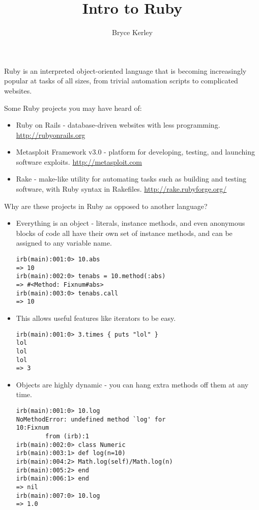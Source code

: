 \documentclass{slides}
\title{Intro to Ruby}
\author{Bryce Kerley}
\newcommand{\svn}[1]{\svnsub#1}
\def\svnsub$#1${#1}
\begin{document}
 \selectfont
\maketitle
\begin{slide}
Ruby is an interpreted object-oriented language that is becoming increasingly popular at tasks of all sizes, from trivial automation scripts to complicated websites.

Some Ruby projects you may have heard of:
\begin{itemize}
\item Ruby on Rails - database-driven websites with less programming. \url{http://rubyonrails.org}
\item Metasploit Framework v3.0 - platform for developing, testing, and launching software exploits.  \url{http://metasploit.com}
\item Rake - make-like utility for automating tasks such as building and testing software, with Ruby syntax in Rakefiles.  \url{http://rake.rubyforge.org/}
\end{itemize}
\end{slide}

\begin{slide}
Why are these projects in Ruby as opposed to another language?
\begin{itemize}
\item Everything is an object - literals, instance methods, and even anonymous blocks of code all have their own set of instance methods, and can be assigned to any variable name.
\begin{verbatim}
irb(main):001:0> 10.abs
=> 10
irb(main):002:0> tenabs = 10.method(:abs)
=> #<Method: Fixnum#abs>
irb(main):003:0> tenabs.call
=> 10
\end{verbatim}
\item This allows useful features like iterators to be easy.
\begin{verbatim}
irb(main):001:0> 3.times { puts "lol" }
lol
lol
lol
=> 3
\end{verbatim}
\end{itemize}
\end{slide}

\begin{slide}
\begin{itemize}
\item Objects are highly dynamic - you can hang extra methods off them at any time.
\begin{verbatim}
irb(main):001:0> 10.log
NoMethodError: undefined method `log' for
10:Fixnum
        from (irb):1
irb(main):002:0> class Numeric
irb(main):003:1> def log(n=10)
irb(main):004:2> Math.log(self)/Math.log(n)
irb(main):005:2> end
irb(main):006:1> end
=> nil
irb(main):007:0> 10.log
=> 1.0
\end{verbatim}
\end{itemize}
\end{slide}
\end{document}

